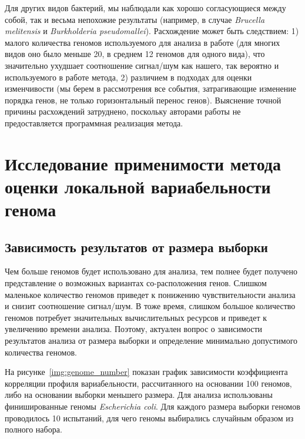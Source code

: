 Для других видов бактерий, мы наблюдали как хорошо согласующиеся между собой, так и весьма непохожие результаты (например, в случае \textit{Brucella melitensis} и \textit{Burkholderia pseudomallei}). Расхождение может быть следствием: 1) малого количества геномов используемого для анализа в работе \cite{oliveira2017chromosomal} (для многих видов оно было меньше 20, в среднем 12 геномов для одного вида), что значительно ухудшает соотношение сигнал/шум как нашего, так вероятно и используемого в работе \cite{oliveira2017chromosomal} метода, 2) различием в подходах для оценки изменчивости (мы берем в рассмотрения все события, затрагивающие изменение порядка генов, не только горизонтальный перенос генов). Выяснение точной причины расхождений затруднено, поскольку авторами работы \cite{oliveira2017chromosomal} не предоставляется программная реализация метода.

\section{Исследование применимости метода оценки локальной вариабельности генома}

\subsection{Зависимость результатов от размера выборки}

Чем больше геномов будет использовано для анализа, тем полнее будет получено представление о возможных вариантах со-расположения генов. Слишком маленькое количество геномов приведет к понижению чувствительности анализа и снизит соотношение сигнал/шум. В тоже время, слишком большое количество геномов потребует значительных вычислительных ресурсов и приведет к увеличению времени анализа. Поэтому, актуален вопрос о зависимости результатов анализа от размера выборки и определение минимально допустимого количества геномов.

На рисунке~\ref{img:genome_number} показан график зависимости коэффициента корреляции профиля вариабельности, рассчитанного на основании 100 геномов, либо на основании выборки меньшего размера. Для анализа использованы финишированные геномы \textit{Escherichia coli}. Для каждого размера выборки геномов проводилось 10 испытаний, для чего геномы выбирались случайным образом из полного набора. 

